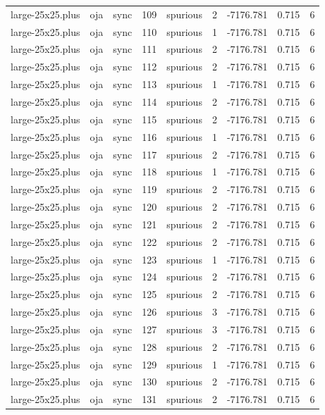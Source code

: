 \begin{tabular}{lllrlrrrr}
large-25x25.plus & oja & sync & 109 & spurious & 2 & -7176.781 & 0.715 & 6 \\
large-25x25.plus & oja & sync & 110 & spurious & 1 & -7176.781 & 0.715 & 6 \\
large-25x25.plus & oja & sync & 111 & spurious & 2 & -7176.781 & 0.715 & 6 \\
large-25x25.plus & oja & sync & 112 & spurious & 2 & -7176.781 & 0.715 & 6 \\
large-25x25.plus & oja & sync & 113 & spurious & 1 & -7176.781 & 0.715 & 6 \\
large-25x25.plus & oja & sync & 114 & spurious & 2 & -7176.781 & 0.715 & 6 \\
large-25x25.plus & oja & sync & 115 & spurious & 2 & -7176.781 & 0.715 & 6 \\
large-25x25.plus & oja & sync & 116 & spurious & 1 & -7176.781 & 0.715 & 6 \\
large-25x25.plus & oja & sync & 117 & spurious & 2 & -7176.781 & 0.715 & 6 \\
large-25x25.plus & oja & sync & 118 & spurious & 1 & -7176.781 & 0.715 & 6 \\
large-25x25.plus & oja & sync & 119 & spurious & 2 & -7176.781 & 0.715 & 6 \\
large-25x25.plus & oja & sync & 120 & spurious & 2 & -7176.781 & 0.715 & 6 \\
large-25x25.plus & oja & sync & 121 & spurious & 2 & -7176.781 & 0.715 & 6 \\
large-25x25.plus & oja & sync & 122 & spurious & 2 & -7176.781 & 0.715 & 6 \\
large-25x25.plus & oja & sync & 123 & spurious & 1 & -7176.781 & 0.715 & 6 \\
large-25x25.plus & oja & sync & 124 & spurious & 2 & -7176.781 & 0.715 & 6 \\
large-25x25.plus & oja & sync & 125 & spurious & 2 & -7176.781 & 0.715 & 6 \\
large-25x25.plus & oja & sync & 126 & spurious & 3 & -7176.781 & 0.715 & 6 \\
large-25x25.plus & oja & sync & 127 & spurious & 3 & -7176.781 & 0.715 & 6 \\
large-25x25.plus & oja & sync & 128 & spurious & 2 & -7176.781 & 0.715 & 6 \\
large-25x25.plus & oja & sync & 129 & spurious & 1 & -7176.781 & 0.715 & 6 \\
large-25x25.plus & oja & sync & 130 & spurious & 2 & -7176.781 & 0.715 & 6 \\
large-25x25.plus & oja & sync & 131 & spurious & 2 & -7176.781 & 0.715 & 6 \\

\end{tabular}
